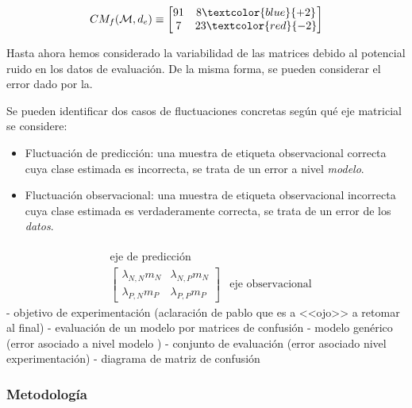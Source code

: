 \[
CM_f(\mathcal{M}, d_{e}) \equiv 
\begin{bmatrix}
91 & 8 \textcolor{blue}{ + 2} \\
7 & 23 \textcolor{red}{ - 2} 
\end{bmatrix}
\]

Hasta ahora hemos considerado la variabilidad de las matrices debido al potencial ruido en los datos de evaluación. 
De la misma forma, se pueden considerar el error dado por la.



Se pueden identificar dos casos de fluctuaciones concretas según qué eje matricial se considere:

\begin{itemize}
    \item Fluctuación de predicción: una muestra de etiqueta observacional correcta cuya clase estimada es incorrecta, se trata de un error a nivel \textit{modelo}.
    \item Fluctuación observacional: una muestra de etiqueta observacional incorrecta cuya clase estimada es verdaderamente correcta, se trata de un error de los \textit{datos}.
\end{itemize}

\[
\begin{array}{ccc}
& & \\
& \text{eje de predicción} &  \\
&
   \begin{bmatrix}
    \lambda_{N,N} m_{N}& \lambda_{N,P} m_{N}\\
    \lambda_{P,N} m_{P}  & \lambda_{P,P} m_{P} 
    \end{bmatrix} & \text{eje observacional}
\end{array}
\]
- objetivo de experimentación (aclaración de pablo que es a <<ojo>> a retomar al final) \newline
- evaluación de un modelo por matrices de confusión \newline
    - modelo genérico (error asociado a nivel modelo ) \newline
    - conjunto de evaluación (error asociado nivel experimentación) \newline
- diagrama de matriz de confusión

\subsubsection{Metodología}

